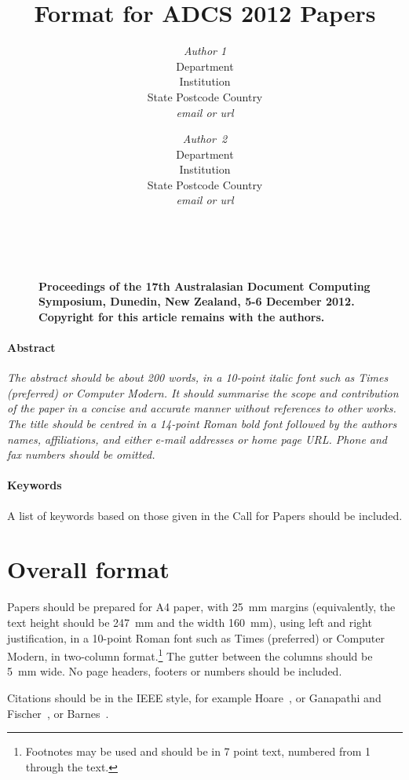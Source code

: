 \documentclass[twocolumn]{article}
\title{Format for ADCS 2012 Papers}
\author{{\em Author 1}\\[1ex]
        Department\\Institution\\State Postcode Country\\[1ex]
        {\em email or url} \and
        {\em Author~2}\\[1ex]
        Department\\Institution\\State Postcode Country\\[1ex]
        {\em email or url}}
\date{}
\begin{document}
\maketitle
\thispagestyle{empty}


        \begin{figure}[b]
	~\\
        \noindent
        {\small\raggedright\bf
        Proceedings of the 17th Australasian 
	Document Computing Symposium,
	Dunedin, New Zealand,
        5-6 December 2012.
	Copyright for this article remains with the authors.
        }
        \end{figure}


\paragraph*{Abstract}
\noindent
{\it 
The abstract should be about 200 words, in a 10-point italic
font such as Times (preferred) or Computer Modern.
It should summarise the scope and contribution of the paper in a
concise and accurate manner without references to other works.
The title should be centred in a 14-point Roman bold font followed by
the authors names, affiliations, and either e-mail addresses or home
page URL.
Phone and fax numbers should be omitted.
} 

\paragraph*{Keywords} 
A list of keywords based on those given in the Call for Papers should
be included.


\section{Overall format}

Papers should be prepared for A4 paper, with 25~mm margins
(equivalently, the text height should be 247~mm and the width 160~mm),
using left and right justification, in a 10-point Roman font such as
Times (preferred) or Computer Modern, in two-column
format.\footnote{Footnotes may be used and should be in 7 point text,
  numbered from 1 through the text.}  The gutter between the columns
should be 5~mm wide.  No page headers, footers or numbers should be
included.

Citations should be in the IEEE style, for example
Hoare~\cite{Hoare73}, or Ganapathi and
Fischer~\cite{GanapathiFischer82}, or Barnes~\cite{Barnes80,Barnes89}.
\end{document}
